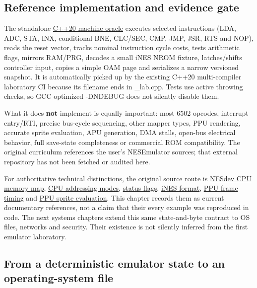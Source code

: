 \subsection{Reference implementation and evidence gate}\label{reference-implementation-and-evidence-gate}

The standalone \href{tools/labs/phase28_emulator_core_lab.cpp}{C++20 machine oracle} executes selected instructions (LDA, ADC, STA, INX, conditional BNE, CLC/SEC, CMP, JMP, JSR, RTS and NOP), reads the reset vector, tracks nominal instruction cycle costs, tests arithmetic flags, mirrors RAM/PRG, decodes a small iNES NROM fixture, latches/shifts controller input, copies a simple OAM page and serializes a narrow versioned snapshot. It is automatically picked up by the existing C++20 multi-compiler laboratory CI because its filename ends in \_lab.cpp. Tests use active throwing checks, so GCC optimized -DNDEBUG does not silently disable them.

What it does \textbf{not} implement is equally important: most 6502 opcodes, interrupt entry/RTI, precise bus-cycle sequencing, other mapper types, PPU rendering, accurate sprite evaluation, APU generation, DMA stalls, open-bus electrical behavior, full save-state completeness or commercial ROM compatibility. The original curriculum references the user's NESEmulator sources; that external repository has not been fetched or audited here.

For authoritative technical distinctions, the original source route is \href{https://www.nesdev.org/wiki/CPU_memory_map}{NESdev CPU memory map}, \href{https://www.nesdev.org/wiki/Addressing_modes}{CPU addressing modes}, \href{https://www.nesdev.org/wiki/Status_flag}{status flags}, \href{https://www.nesdev.org/wiki/INES}{iNES format}, \href{https://www.nesdev.org/wiki/PPU_frame_timing}{PPU frame timing} and \href{https://www.nesdev.org/wiki/PPU_sprite_evaluation}{PPU sprite evaluation}. This chapter records them as current documentary references, not a claim that their every example was reproduced in code. The next systems chapters extend this same state-and-byte contract to OS files, networks and security. Their existence is not silently inferred from the first emulator laboratory.

\subsection{From a deterministic emulator state to an operating-system file}\label{from-a-deterministic-emulator-state-to-an-operating-system-file}

